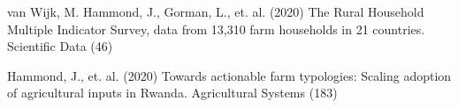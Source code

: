 
van Wijk, M. Hammond, J., Gorman, L., et. al. (2020) The Rural Household Multiple Indicator Survey, data from 13,310 farm households in 21 countries. Scientific Data (46)

Hammond, J., et. al. (2020) Towards actionable farm typologies: Scaling adoption of agricultural inputs in Rwanda. Agricultural Systems (183)
